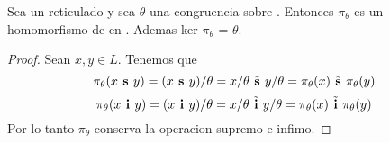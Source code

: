 \begin{lemma}
  Sea \reticulAlg un reticulado y sea $\theta$ una congruencia sobre \reticulAlg. Entonces $\pi_\theta$ es un 
  homomorfismo de \reticulAlg en .
  Ademas ker $\pi_\theta$ = $\theta$.
\end{lemma}
\begin{proof}
  Sean $x, y \in L$. Tenemos que
  $$
  \pi_\theta(x\textbf{ s }y) = (x\textbf{ s }y)/\theta = x/\theta \tilde{\textbf{ s }} y/\theta = \pi_\theta(x) \tilde{\textbf{ s }} \pi_\theta(y)
  $$
  $$
  \pi_\theta(x\textbf{ i }y) = (x\textbf{ i }y)/\theta = x/\theta \tilde{\textbf{ i }} y/\theta = \pi_\theta(x) \tilde{\textbf{ i }} \pi_\theta(y)
  $$
  Por lo tanto $\pi_\theta$ conserva la operacion supremo e infimo.

\end{proof}

